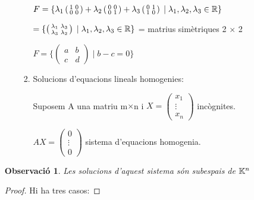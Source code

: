 \documentclass[a4paper, 11pt]{article}
\newtheorem*{obs}{Observació}
\begin{document}
\begin{enumerate}[$\bullet$]
\begin{enumerate}[(i)]
\begin{enumerate}[$\diamond$]
		\medskip
		
		$F = \{ \lambda_1 \left( \begin{smallmatrix}
			1 & 0 \\ 0 & 0
		\end{smallmatrix} \right) + \lambda_2 \left( \begin{smallmatrix}
		0 & 0 \\ 0 & 1
		\end{smallmatrix} \right) + \lambda_3 \left( \begin{smallmatrix}
		0 & 1 \\ 1 & 0
		\end{smallmatrix} \right) \; | \; \lambda_1, \lambda_2, 	\lambda_3 \in \mathbb{R} \} $
		
		\medskip
		
		$=\{ \left( \begin{smallmatrix}
			\lambda_1 & \lambda_3 \\ \lambda_3 & \lambda_2
		\end{smallmatrix} \right) \; | \; \lambda_1, \lambda_2, \lambda_3 \in \mathbb{R}\}$ = matrius simètriques 2 $\times$ 2
		
		\medskip
		
		$F= \{ \left( \begin{smallmatrix}
			a & b \\ c & d
		\end{smallmatrix} \right) \; | \; b-c=0\}$
		
		\medskip
		
		\item Solucions d'equacions lineals homogenies:
		
		Suposem A una matriu m$\times$n  i $X= \left( \begin{smallmatrix}
			x_1 \\
			\vdots \\
			x_n
		\end{smallmatrix} \right)$ incògnites.
		
		\medskip
		
		$AX=\left( \begin{smallmatrix}
			0 \\
			\vdots \\
			0
		\end{smallmatrix} \right)$ sistema d'equacions homogenia.
		\end{enumerate}
	\end{enumerate}
\begin{obs}
	Les solucions d'aquest sistema són subespais de $\mathbb{K}^n$
\end{obs}
\begin{proof} Hi ha tres casos:
	

\end{proof}
\end{enumerate}
\end{document}

